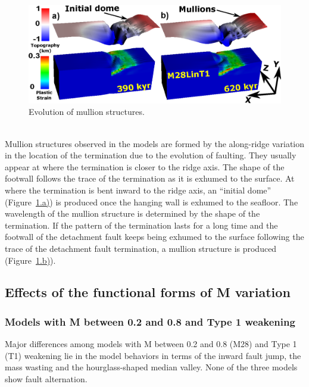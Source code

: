 \begin{figure}[h]
  \centering
    \includegraphics[width=1.0\textwidth]{./Figures/fig_Results_3_2_6_mullion_evolution.eps}
  \caption{Evolution of mullion structures.}
 \label{fig_Results_3_2_6_mullion_evolution}
\end{figure}
~\\
Mullion structures observed in the models are formed by the along-ridge variation in the location of the termination due to the evolution of faulting. They usually appear at where the termination is closer to the ridge axis. The shape of the footwall follows the trace of the termination as it is exhumed to the surface. At where the termination is bent inward to the ridge axis, an ``initial dome'' (Figure~\hyperref[fig_Results_3_2_6_mullion_evolution]{\ref{fig_Results_3_2_6_mullion_evolution}.a)}) is produced once the hanging wall is exhumed to the seafloor. The wavelength of the mullion structure is determined by the shape of the termination. If the pattern of the termination lasts for a long time and the footwall of the detachment fault keeps being exhumed to the surface following the trace of the detachment fault termination, a mullion structure is produced (Figure~\hyperref[fig_Results_3_2_6_mullion_evolution]{\ref{fig_Results_3_2_6_mullion_evolution}.b)}). 


\subsection{Effects of the functional forms of M variation}

\subsubsection{Models with M between 0.2 and 0.8 and Type 1 weakening}

Major differences among models with M between 0.2 and 0.8 (M28) and Type 1 (T1) weakening lie in the model behaviors in terms of the inward fault jump, the mass wasting and the hourglass-shaped median valley. None of the three models show fault alternation.    

